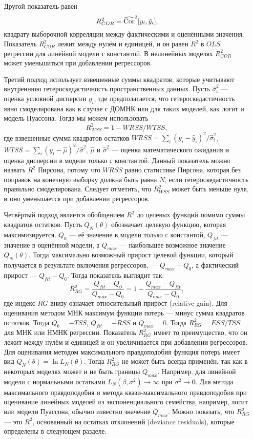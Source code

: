 Другой показатель равен
\[
R_{COR}^2 = \widehat{\mathrm{Cor}}^2[y_i, \hat{y}_i],
\]
квадрату выборочной корреляции между фактическими и оценёнными значения. Показатель $R_{COR}^2$ лежит между нулём и единицей, и он равен $R^2$ в $OLS$ регрессии для линейной модели с константой. В нелинейных моделях $R_{COR}^2$ может уменьшиться при добавлении регрессоров. 

Третий подход использует взвешенные суммы квадратов, которые учитывают внутреннюю гетероскедастичность пространственных данных. Пусть $\hat{\sigma}_i^2$ --- оценка условной дисперсии $y_i$, где предполагается, что гетероскедастичность явно смоделирована как в случае с ДОМНК или для таких моделей, как логит и модель Пуассона. Тогда мы можем использовать
\[
R_{WSS}^2 = 1 - WRSS/WTSS,
\]
где взвешенные сумма квадратов остатков $WRSS = \sum_i (y_i - \hat{y}_i)^2/\hat{\sigma}_i^2$, $WTSS = \sum_i (y_i - \hat{\mu})^2/\hat{\sigma}^2$, $\hat{\mu}$ и $\hat{\sigma}^2$ --- оценка математического ожидания и оценка дисперсии в модели только с константой. Данный показатель можно назвать $R^2$ Пирсона, потому что $WRSS$ равно статистике Пирсона, которая без поправок на конечную выборку должна быть равна $N$, если гетероскедастичность правильно смоделирована. Следует отметить, что $R_{WSS}^2$ может быть меньше нуля, и оно уменьшается при добавлении регрессоров.

Четвёртый подход является обобщением $R^2$ до целевых функций помимо суммы квадратов остатков. Пусть $Q_N(\theta)$ обозначает целевую функцию, которая максимизируется. $Q_0$ --- её значение в модели только с константой, $Q_{fit}$ --- значение в оценённой модели, а $Q_{max}$ --- наибольшее возможное значение $Q_N(\theta)$. Тогда максимально возможный прирост целевой функции, который получается в результате включения регрессоров, --- $Q_{max} - Q_0$, а фактический прирост --- $Q_{fit} - Q_0$. Тогда показатель выглядит так:
\[
R_{RG}^2 = \frac{Q_{fit} - Q_0}{Q_{max} - Q_0} = 1 - \frac{Q_{max} - Q_{fit}}{Q_{max} - Q_0},
\]
где индекс $RG$ внизу означает относительный прирост (relative gain). Для оценивания методом МНК максимум функции потерь ---  минус сумма квадратов остатков. Тогда $Q_0 = - TSS$, $Q_{fit} = - RSS$ и $Q_{max} = 0$. Тогда $R_{RG}^2 = ESS/TSS$ для МНК или НМНК регрессии. Показатель $R_{RG}^2$ имеет то преимущество, что он лежит между нулём и единицей и он увеличивается при добавлении регрессоров. Для оценивания методом максимального правдоподобия функция потерь имеет вид $Q_N(\theta) = \ln L_N(\theta)$. Тогда $R_{RG}^2$ не может быть всегда применён, так как в некоторых моделях может и не быть границы $Q_{max}$. Например, для линейной модели с нормальными остатками $L_N(\beta, \sigma^2) \rightarrow \infty$ при $\sigma^ 2 \rightarrow 0$. Для метода максимального правдоподобия и метода квази-максимального правдоподобия при оценивание линейных моделей из экспоненциального семейства, например, логит или модели Пуассона, обычно известно значение $Q_{max}$. Можно показать, что $R_{RG}^2$ --- это $R^2$, основанный на остатках отклонений (deviance residuals), которые определены в следующем разделе.

